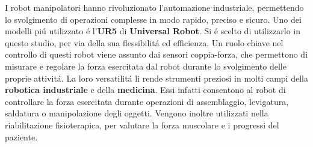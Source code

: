I robot manipolatori hanno rivoluzionato l'automazione industriale, permettendo lo svolgimento
di operazioni complesse in modo rapido, preciso e sicuro. 
Uno dei modelli pi\'{u} utilizzato \'{e} l'\textbf{UR5} di \textbf{Universal Robot}. Si \'{e} scelto di utilizzarlo in questo studio, 
per via della sua flessibilit\'{a} ed efficienza. 
Un ruolo chiave nel controllo di questi robot viene assunto dai sensori coppia-forza,
che permettono di misurare e regolare la forza esercitata dal robot durante lo svolgimento delle proprie attivit\'{a}. 
La loro versatilit\'{a} li rende strumenti preziosi in molti campi della \textbf{robotica industriale} e della \textbf{medicina}. 
Essi infatti consentono al robot di controllare la forza esercitata durante operazioni di assemblaggio, levigatura, 
saldatura o manipolazione degli oggetti. 
Vengono inoltre utilizzati nella riabilitazione fisioterapica, per valutare la forza muscolare 
e i progressi del paziente. 
